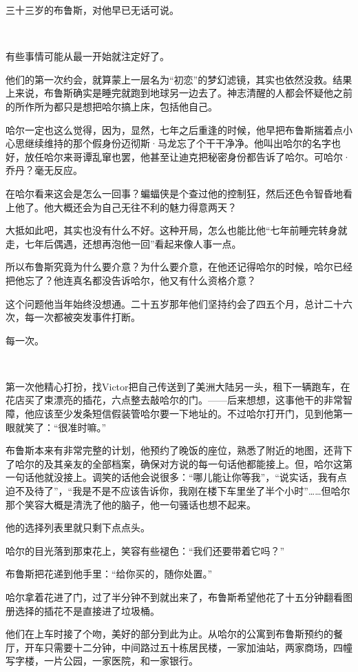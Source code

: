 \documentclass[../main]{subfiles}
\begin{document}
三十三岁的布鲁斯，对他早已无话可说。

~\

有些事情可能从最一开始就注定好了。

他们的第一次约会，就算蒙上一层名为“初恋”的梦幻滤镜，其实也依然没救。结果上来说，布鲁斯确实是睡完就跑到地球另一边去了。神志清醒的人都会怀疑他之前的所作所为都只是想把哈尔搞上床，包括他自己。

哈尔一定也这么觉得，因为，显然，七年之后重逢的时候，他早把布鲁斯揣着点小心思继续维持的那个假身份迈彻斯·马龙忘了个干干净净。他叫出哈尔的名字也好，放任哈尔来哥谭乱窜也罢，他甚至让迪克把秘密身份都告诉了哈尔。可哈尔·乔丹？毫无反应。

在哈尔看来这会是怎么一回事？蝙蝠侠是个查过他的控制狂，然后还色令智昏地看上他了。他大概还会为自己无往不利的魅力得意两天？

大抵如此吧，其实也没有什么不好。这种开局，怎么也能比他“七年前睡完转身就走，七年后偶遇，还想再泡他一回”看起来像人事一点。

所以布鲁斯究竟为什么要介意？为什么要介意，在他还记得哈尔的时候，哈尔已经把他忘了？他连真名都没告诉哈尔，他又有什么资格介意？

这个问题他当年始终没想通。二十五岁那年他们坚持约会了四五个月，总计二十六次，每一次都被突发事件打断。

每一次。

~\

第一次他精心打扮，找Victor把自己传送到了美洲大陆另一头，租下一辆跑车，在花店买了束漂亮的插花，六点整去敲哈尔的门。——后来想想，这事他干的非常智障，他应该至少发条短信假装管哈尔要一下地址的。不过哈尔打开门，见到他第一眼就笑了：“很准时嘛。”

布鲁斯本来有非常完整的计划，他预约了晚饭的座位，熟悉了附近的地图，还背下了哈尔的及其亲友的全部档案，确保对方说的每一句话他都能接上。但，哈尔这第一句话他就没接上。调笑的话他会说很多：“哪儿能让你等我”，“说实话，我有点迫不及待了”，“我是不是不应该告诉你，我刚在楼下车里坐了半个小时”……但哈尔那个笑容大概是清洗了他的脑子，他一句骚话也想不起来。

他的选择列表里就只剩下点点头。

哈尔的目光落到那束花上，笑容有些褪色：“我们还要带着它吗？”

布鲁斯把花递到他手里：“给你买的，随你处置。”

哈尔拿着花进了门，过了半分钟不到就出来了，布鲁斯希望他花了十五分钟翻看图册选择的插花不是直接进了垃圾桶。

他们在上车时接了个吻，美好的部分到此为止。从哈尔的公寓到布鲁斯预约的餐厅，开车只需要十二分钟，中间路过五十栋居民楼，一家加油站，两家商场，四幢写字楼，一片公园，一家医院，和一家银行。
\end{document}
